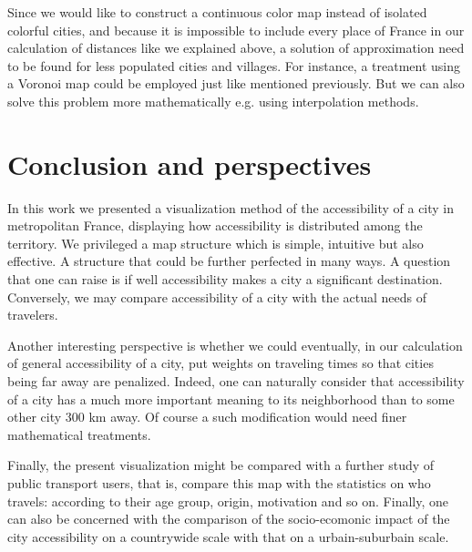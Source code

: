 \documentclass{vgtc}                          %
\begin{document}
Since we would like to construct a continuous color map instead of isolated colorful cities, and because it is impossible to include every place of France in our calculation of distances like we explained above, a solution of approximation need to be found for less populated cities and villages. For instance, a treatment using a Voronoi map could be employed just like mentioned previously. But we can also solve this problem more mathematically  e.g. using interpolation methods.


\section{Conclusion and perspectives}

\vspace{0.2cm}

In this work we presented a visualization method of the accessibility of a city in metropolitan France, displaying how accessibility is distributed among the territory. We privileged a map structure which is simple, intuitive but also effective. A structure that could be further perfected in many ways. A question that one can raise is if well accessibility makes a city a significant destination. Conversely, we may compare accessibility of a city with the actual needs of travelers.

Another interesting perspective is whether we could eventually, in our calculation of general accessibility of a city, put weights on traveling times so that cities being far away are penalized. Indeed, one can naturally consider that accessibility of a city has a much more important meaning to its neighborhood than to some other city 300 km away. Of course a such modification would need finer mathematical treatments.

Finally, the present visualization might be compared with a further study of public transport users, that is, compare this map with the statistics on who travels: according to their age group, origin, motivation and so on. Finally, one can also be concerned with the comparison of the socio-ecomonic impact of the city accessibility on a countrywide scale with that on a urbain-suburbain scale.




%

%
%
%


\end{document}
